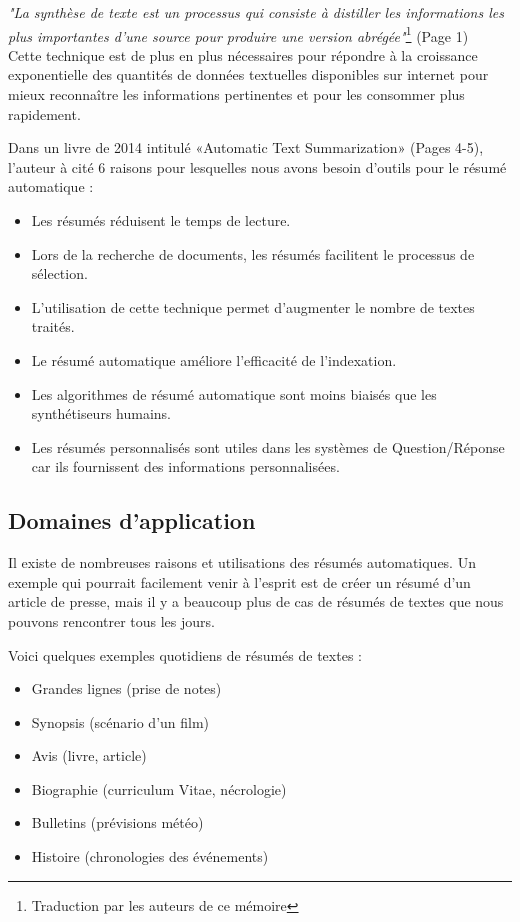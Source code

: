     \emph{"La synthèse de texte est un processus qui consiste à distiller les informations les plus importantes d'une source pour produire une version abrégée"}\footnote{Traduction par les auteurs de ce mémoire} \cite{aats}(Page 1)\\

    Cette technique est de plus en plus nécessaires pour répondre à la croissance exponentielle des quantités  de données textuelles disponibles sur internet pour mieux reconnaître les informations pertinentes et pour les consommer plus rapidement.

    Dans un livre de 2014 intitulé «Automatic Text Summarization» \cite{atsjmtm}(Pages 4-5), l'auteur à cité 6 raisons pour lesquelles nous avons besoin d'outils pour le résumé automatique :

    \begin{itemize}
        \item Les résumés réduisent le temps de lecture.
        \item Lors de la recherche de documents, les résumés facilitent le processus de sélection.
        \item L'utilisation de cette technique permet d'augmenter le nombre de textes traités.
        \item Le résumé automatique améliore l'efficacité de l'indexation.
        \item Les algorithmes de résumé automatique sont moins biaisés que les synthétiseurs humains.
        \item Les résumés personnalisés sont utiles dans les systèmes de Question/Réponse car ils fournissent des informations personnalisées.
    \end{itemize}

    \subsection{Domaines d'application}    
    Il existe de nombreuses raisons et utilisations des résumés automatiques. Un exemple qui pourrait facilement venir à l'esprit est de créer un résumé d'un article de presse, mais il y a beaucoup plus de cas de résumés de textes que nous pouvons rencontrer tous les jours.

    Voici quelques exemples quotidiens de résumés de textes :
    \begin{itemize}
        \item Grandes lignes (prise de notes)
        \item Synopsis (scénario d'un film)
        \item Avis (livre, article)
        \item Biographie (curriculum Vitae, nécrologie)
        \item Bulletins (prévisions météo)
        \item Histoire (chronologies des événements)
    \end{itemize}

